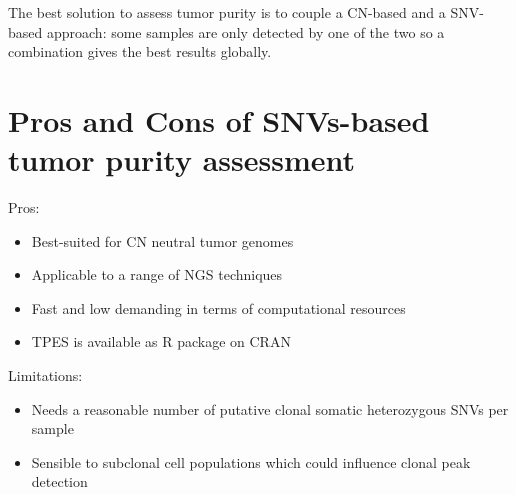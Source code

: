 The best solution to assess tumor purity is to couple a CN-based and a
SNV-based approach: some samples are only detected by one of the two so a
combination gives the best results globally.

\section{Pros and Cons of SNVs-based tumor purity assessment}
Pros:
\begin{itemize}
    \item Best-suited for CN neutral tumor genomes
    \item Applicable to a range of NGS techniques
    \item Fast and low demanding in terms of computational resources
    \item TPES is available as R package on CRAN
\end{itemize}
Limitations:
\begin{itemize}
    \item Needs a reasonable number of putative clonal somatic heterozygous SNVs
    per sample
    \item  Sensible to subclonal cell populations which could influence clonal
    peak detection
\end{itemize}
